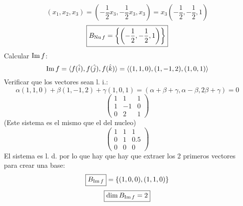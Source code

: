 \documentclass[../practica.root.tex]{subfiles}
\begin{document}
\begin{enumerate}
\begin{enumerate}
\[                    \] \[
                        (x_1, x_2, x_3) = \left( -\frac{1}{2}x_3, -\frac{1}{2}x_3, x_3 \right) = x_3\left(-\frac{1}{2}, -\frac{1}{2}, 1\right)
                    \] \[
                        \boxed{B_{\operatorname{Nu} f} = \left\{\left(-\frac{1}{2}, -\frac{1}{2}, 1\right)\right\}}
                    \]
                    Calcular \(\operatorname{Im} f\):
                    \[ \operatorname{Im} f = \langle f(\hat{i}), f(\hat{j}), f(\hat{k}) \rangle = \langle (1,1,0),(1,-1,2),(1,0,1) \rangle\]
                    Verificar que los vectores sean l. i.:
                    \[
                        \alpha(1,1,0) + \beta(1,-1,2) + \gamma(1,0,1) = (\alpha + \beta + \gamma, \alpha - \beta, 2\beta + \gamma) = 0
                    \] \[
                        \begin{pmatrix}
                            1 & 1  & 1 \\
                            1 & -1 & 0 \\
                            0 & 2  & 1
                        \end{pmatrix}
                    \]
                    (Este sistema es el mismo que el del nucleo)
                    \[
                        \begin{pmatrix}
                            1 & 1 & 1   \\
                            0 & 1 & 0.5 \\
                            0 & 0 & 0
                        \end{pmatrix}
                    \]
                    El sistema es l. d. por lo que hay que hay que extraer los 2 primeros vectores para crear una base:
                    \[ \boxed{B_{\operatorname{Im} f}} = \{ (1,0,0),(1,1,0) \} \]
                    \[ \boxed{\dim B_{\operatorname{Im} f} = 2} \]


\end{enumerate}
\end{enumerate}
\end{document}
